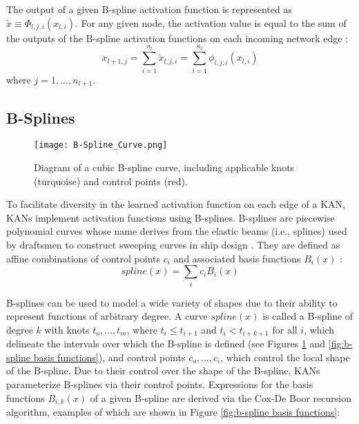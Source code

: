 The output of a given B-spline activation function is represented as \(\tilde{x} \equiv \Phi_{l,j,i} (x_{l,i})\).   For any given node, the activation value is equal to the sum of the outputs of the B-spline activation functions on each incoming network edge \cite{liu2024}:
\begin{equation}
x_{l+1, j} = \sum_{i=1}^{n_l} \tilde{x}_{l,j,i} = \sum_{i=1}^{n_l} \phi_{l,j,i} (x_{l,i})
\end{equation}
where \(j = 1, ..., n_{l+1}\).

\subsection{B-Splines}
\begin{figure} [ht]
\begin{center}
\centerline{\texttt{[image: B-Spline\_Curve.png]}}
\caption{Diagram of a cubic B-spline curve, including applicable knots (turquoise) and control points (red).}
\label{fig:b-spline curve}
\end{center}
\end{figure}
To facilitate diversity in the learned activation function on each edge of a KAN, KANs implement activation functions using B-splines.  B-splines are piecewise polynomial curves whose name derives from the elastic beams (i.e., splines) used by draftsmen to construct sweeping curves in ship design \cite{prautzsch2002}.  They are defined as affine combinations of control points \(c_i\) and associated basis functions \(B_i (x)\) \cite{liu2024}:
\begin{equation} \label{eq:KANspline-1}
spline(x) = \sum_i c_i B_i(x)
\end{equation}

B-splines can be used to model a wide variety of shapes due to their ability to represent functions of arbitrary degree.  A curve \(spline(x)\) is called a B-spline of degree \(k\) with knots \(t_o, ..., t_m\), where \(t_i \leq t_{i+1}\) and \(t_i < t_{i+k+1}\) for all \(i\), which delineate the intervals over which the B-spline is defined (see Figures \ref{fig:b-spline curve} and \ref{fig:b-spline basis functions}), and control points \(c_o, ..., c_i\), which control the local shape of the B-spline. Due to their control over the shape of the B-spline, KANs parameterize B-splines via their control points. Expressions for the basis functions \(B_{i,k} (x)\) of a given B-spline are derived via the Cox-De Boor recursion algorithm, examples of which are shown in Figure \ref{fig:b-spline basis functions}:

